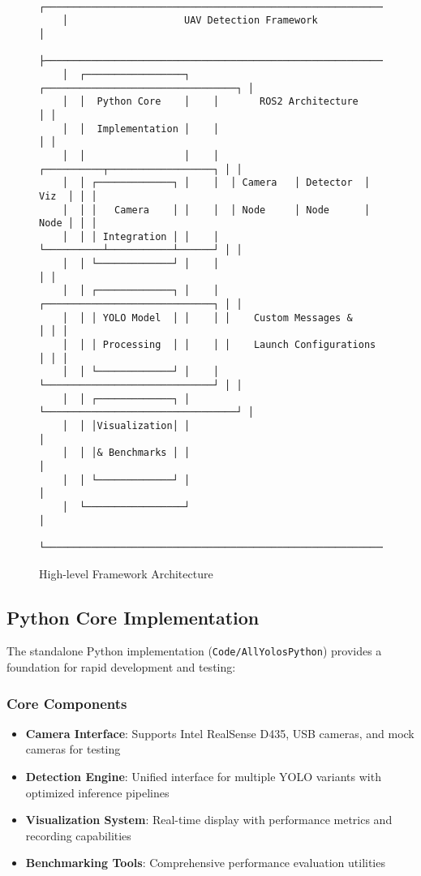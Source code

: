 \documentclass[12pt,a4paper]{article}
\begin{document}
\begin{figure}[H]
    \centering
    \begin{verbatim}
    ┌─────────────────────────────────────────────────────────────┐
    │                    UAV Detection Framework                  │
    ├─────────────────────────────────────────────────────────────┤
    │  ┌─────────────────┐    ┌─────────────────────────────────┐ │
    │  │  Python Core    │    │       ROS2 Architecture        │ │
    │  │  Implementation │    │                                 │ │
    │  │                 │    │  ┌──────────┬──────────────────┐ │ │
    │  │ ┌─────────────┐ │    │  │ Camera   │ Detector  │ Viz  │ │ │
    │  │ │   Camera    │ │    │  │ Node     │ Node      │ Node │ │ │
    │  │ │ Integration │ │    │  └──────────┴───────────┴──────┘ │ │
    │  │ └─────────────┘ │    │                                 │ │
    │  │ ┌─────────────┐ │    │ ┌─────────────────────────────┐ │ │
    │  │ │ YOLO Model  │ │    │ │    Custom Messages &        │ │ │
    │  │ │ Processing  │ │    │ │    Launch Configurations    │ │ │
    │  │ └─────────────┘ │    │ └─────────────────────────────┘ │ │
    │  │ ┌─────────────┐ │    └─────────────────────────────────┘ │
    │  │ │Visualization│ │                                        │
    │  │ │& Benchmarks │ │                                        │
    │  │ └─────────────┘ │                                        │
    │  └─────────────────┘                                        │
    └─────────────────────────────────────────────────────────────┘
    \end{verbatim}
    \caption{High-level Framework Architecture}
\end{figure}

\subsection{Python Core Implementation}

The standalone Python implementation (\texttt{Code/AllYolosPython}) provides a foundation for rapid development and testing:

\subsubsection{Core Components}
\begin{itemize}
    \item \textbf{Camera Interface}: Supports Intel RealSense D435, USB cameras, and mock cameras for testing
    \item \textbf{Detection Engine}: Unified interface for multiple YOLO variants with optimized inference pipelines
    \item \textbf{Visualization System}: Real-time display with performance metrics and recording capabilities
    \item \textbf{Benchmarking Tools}: Comprehensive performance evaluation utilities
\end{itemize}
\end{document}
